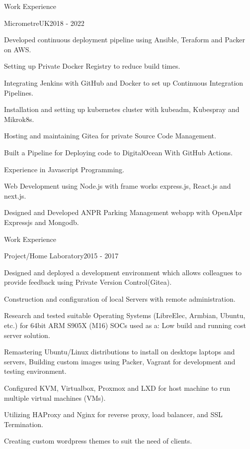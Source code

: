 \documentclass{resume}
\begin{document}
\begin{rSection}{Work Experience}
\begin{rSubsection}{MicrometreUK}{2018 - 2022}{}

\item Developed continuous deployment pipeline using Ansible, Teraform and Packer on AWS. 
\item Setting up Private Docker Registry  to reduce build times.  
\item Integrating Jenkins with GitHub and Docker to set up Continuous Integration Pipelines.
\item Installation and setting up kubernetes cluster with kubeadm, Kubespray and Mikrok8s. 
\item Hosting and maintaining Gitea for private Source Code Management.
\item Built a Pipeline for  Deploying code to DigitalOcean With GitHub Actions.
\item Experience in Javascript Programming.
\item Web Development using Node.js with frame works express.js, React.js and next.js.
\item Designed and Developed ANPR Parking Management webapp with OpenAlpr Expressjs and Mongodb.
\end{rSubsection}
\end{rSection}

\begin{rSection}{Work Experience}
\begin{rSubsection}{Project/Home Laboratory}{2015 - 2017}{}

\item Designed and deployed a development environment which allows colleagues to
provide feedback using Private Version Control(Gitea).
\item Construction and configuration of local Servers with remote administration.
\item Research and tested suitable Operating Systems (LibreElec, Armbian, Ubuntu,
etc.) for 64bit ARM S905X (M16) SOCs used as a: Low build and running cost
server solution.
\item Remastering Ubuntu/Linux distributions to install on desktops laptops and
servers, Building custom images using Packer, Vagrant for development and
testing environment.
\item Configured KVM, Virtualbox, Proxmox and LXD for host machine to run
multiple virtual machines (VMs).
\item Utilizing HAProxy and Nginx for reverse proxy, load balancer, and SSL Termination.
\item Creating custom wordpress themes to suit the need of clients.
\end{rSubsection}
\end{rSection}
\end{document}
